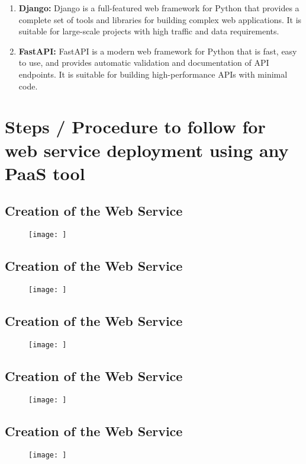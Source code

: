 \documentclass[11pt]{article}
\begin{document}
\begin{enumerate}
\begin{enumerate}
              \item \textbf{Django:} Django is a full-featured web framework for Python that provides a complete set of tools and libraries for building complex web applications. It is suitable for large-scale projects with high traffic and data requirements.
              \item \textbf{FastAPI:} FastAPI is a modern web framework for Python that is fast, easy to use, and provides automatic validation and documentation of API endpoints. It is suitable for building high-performance APIs with minimal code.
          \end{enumerate}
\end{enumerate}

\section{Steps / Procedure to follow for web service deployment using any PaaS tool}

\subsection{Creation of the Web Service}
\begin{figure}[H]
    \centering
    \texttt{[image: ]}
    \caption{}
\end{figure}
\subsection{Creation of the Web Service}
\begin{figure}[H]
    \centering
    \texttt{[image: ]}
    \caption{}
\end{figure}
\subsection{Creation of the Web Service}
\begin{figure}[H]
    \centering
    \texttt{[image: ]}
    \caption{}
\end{figure}
\subsection{Creation of the Web Service}
\begin{figure}[H]
    \centering
    \texttt{[image: ]}
    \caption{}
\end{figure}
\subsection{Creation of the Web Service}
\begin{figure}[H]
    \centering
    \texttt{[image: ]}
    \caption{}
\end{figure}
\end{document}
